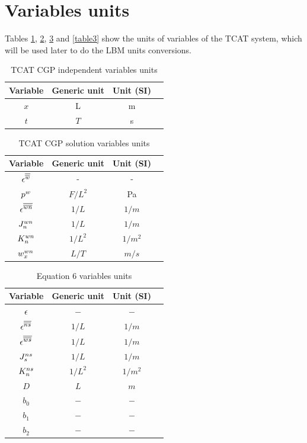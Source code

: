 \documentclass{article}
\begin{document}
\section{Variables units}
Tables \ref{tablespace_time}, \ref{table1}, \ref{table2} and \ref{table3} show the units of variables of the TCAT system, which will be used later to do the LBM units conversions.
\begin{table}[h!]\centering
 \begin{tabular}{ c c  c c} 
 \hline
Variable   & Generic unit &  Unit (SI) \\  [1ex]
 \hline
\( x\)  &  L  & m   \\
\(t\)  &  \( T\)  & s    \\[1ex] 
 \hline
 \end{tabular}
 \caption{TCAT CGP independent variables units}
\label{tablespace_time}
\end{table}



 \begin{table}[h!]
\centering
 \begin{tabular}{ c c  c c} 
 \hline
Variable   & Generic unit &  Unit (SI) \\  [1ex]
 \hline
\( {{{\epsilon}^{{\overline{\overline{w}}}}}}\)  &  -  & -    \\
\( {{{p_{}^{w}}}}\)  &  \( {F}/{L^2}\)  & Pa    \\
\( {{{\epsilon}^{{\overline{\overline{{wn}}}}}}}\)  &  \( {1}/{L}\)  & \( {1}/{m}\)  \\
\( J_n^{wn}\)  &  \( {1}/{L}\)  & \( {1}/{m}\)  \\
\(K_n^{wn}\)  &  \( {1}/{L^2}\)  & \( {1}/{m^2}\)  \\
\(w_x^{wn}\)  &  \( {L}/{T}\)  & \( {m}/{s}\)  \\[1ex] 
 \hline
 \end{tabular}
 \caption{TCAT CGP solution variables units}
\label{table1}
\end{table}


 \begin{table}[h!]
\centering
 \begin{tabular}{ c c  c c} 
 \hline
Variable   & Generic unit &  Unit (SI) \\  [1ex]
 \hline
  \({\epsilon}\)     &  \(-\)  & \(-\) \\
 \({{{\epsilon}^{{\overline{\overline{{ns}}}}}}}\)     &  \( {1}/{L}\)  & \( {1}/{m}\) \\
 \({{{\epsilon}^{{\overline{\overline{{ws}}}}}}}\)     &  \( {1}/{L}\)  & \( {1}/{m}\) \\ 
\({J_s^{ns}}\)   &  \( {1}/{L}\)  & \( {1}/{m}\)  \\
\({K_n^{ns}}\)  &  \( {1}/{L^2}\)  & \( {1}/{m^2}\)  \\
\(D\)  &  \( {L}\)  & \( {m}\)  \\
\(b_0\)  &  \( -\)  & \( -\)  \\
\(b_1\)  &  \( -\)  & \( -\)  \\
\(b_2\)  &  \( -\)  & \( -\)  \\[1ex]  
 \hline
 \end{tabular}
 \caption{Equation 6 variables units}
\label{table2}
\end{table}
\end{document}
